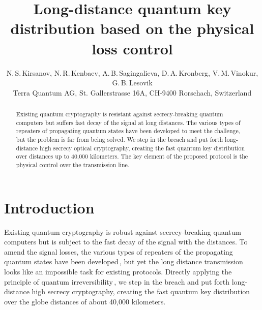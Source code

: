\documentclass[a4paper]{article}
\begin{document}
\title{Long-distance quantum key distribution based on the physical loss control}

\author{N.\,S.\,Kirsanov, N.\,R.\,Kenbaev, A.\,B.\,Sagingalieva, D.\,A.\,Kronberg, V.\,M.\,Vinokur, G.\,B.\,Lesovik\\
Terra Quantum AG, St. Gallerstrasse 16A, CH-9400 Rorschach, Switzerland}
\maketitle
\begin{abstract}
Existing quantum cryptography is resistant against secrecy-breaking quantum computers but suffers fast decay of the signal at long distances. The various types of repeaters of propagating quantum states have been developed to meet the challenge, but the problem is far from being solved. We step in the breach and put forth long-distance high secrecy optical cryptography, creating the fast quantum key distribution over distances up to 40,000 kilometers. The key element of the proposed protocol is the physical control over the transmission line.
\end{abstract}
\section{Introduction}


Existing quantum cryptography is robust against secrecy-breaking quantum computers but is subject to the fast decay of the signal with the distances. To amend the signal losses, the various types of repeaters of the propagating quantum states have been developed\,\cite{Kimble_Qrepeater, Sangouard_Qrepeater, Simon_Qrepeater, Duan_Qrepeater, Briegel_Qrepeater, Kok_Qrepeater, Childress_Qrepeater, van_Loock_Qrepeater, Wang_Qrepeater, Sangouard2_Qrepeater, Azuma_Qrepeater, Zwerger_Qrepeater, Munro_Qrepeater, Jiang_Qrepeater, Munro2_Qrepeater, Grudka_Qrepeater}, but yet the long distance transmission looks like an impossible task for existing protocols. 
Directly applying the principle of quantum irreversibility\,\cite{Lesovik_Qirreversibility, Kirsanov_Qirreversibility, Lesovik2_Qirreversibility}, we step in the breach and put forth long-distance high secrecy cryptography, creating the fast quantum key distribution over the globe distances of about 40,000 kilometers.
\end{document}
